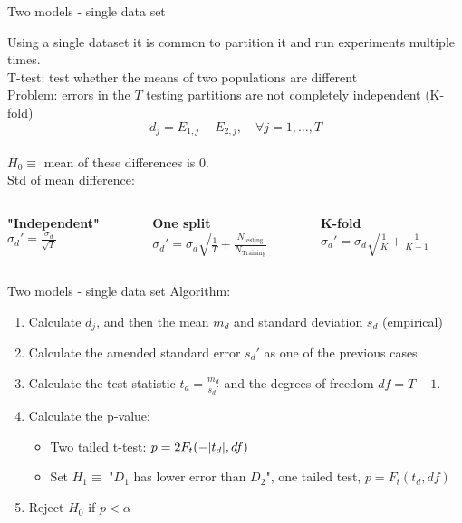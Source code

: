 \documentclass{beamer}
\DeclarePairedDelimiter\abs{\lvert}{\rvert}%
\begin{document}
\begin{frame}{Two models - single data set \citep{NIPS1999_7d12b66d}}

Using a single dataset it is common to partition it and run experiments multiple times.\\

    {\color{blue} T-test: test whether the means of two populations are different}\\
    \pause
    {\color{red} Problem: errors in the \(T\) testing partitions are not completely independent (K-fold)}\\
    \pause
\[d_j = E_{1,j} - E_{2,j}, \quad \forall j = 1,\dots,T\]\\
\(H_0 \equiv\) mean of these differences is \(0\).\\
    \pause
    Std of mean difference:
    \begin{columns}
\begin{column}{0.3\textwidth}
\textbf{"Independent"}\\
\(\sigma_{d}' = \frac{\sigma_d}{\sqrt{T}}\)
\end{column}
\begin{column}{0.3\textwidth} 
\textbf{One split}\\
\(\sigma_{d}' = \sigma_d \sqrt{\frac{1}{T} + \frac{N_{\text{testing}}}{N_{\text{Training}}}}\)
\end{column}
\begin{column}{0.3\textwidth}
\textbf{K-fold}\\
\(
\sigma_{d}' = \sigma_d \sqrt{\frac{1}{K} + \frac{1}{K-1}}
\)
\end{column}
\end{columns}
\end{frame}

\begin{frame}{Two models - single data set \citep{NIPS1999_7d12b66d}}
Algorithm:
    \begin{enumerate}
        \item Calculate \(d_j\), and then the mean \(m_d\) and standard deviation \(s_d\) (empirical)
        \item Calculate the amended standard error \(s_{d}'\) as one of the previous cases
        \item Calculate the test statistic \(t_d = \frac{m_d}{s_d'}\) and the degrees of freedom \(df = T-1\).
        \item Calculate the p-value:
        \begin{itemize}
            \item Two tailed t-test: \(p = 2 F_t(-\abs{t_d}, df)\)
            \item Set \(H_1 \equiv\) "\(D_1\) has lower error than \(D_2\)", one tailed test, \(p = F_t(t_d, df)\)
        \end{itemize}
        \item Reject \(H_0\) if \(p < \alpha\)
    \end{enumerate}
\end{frame}
\end{document}
